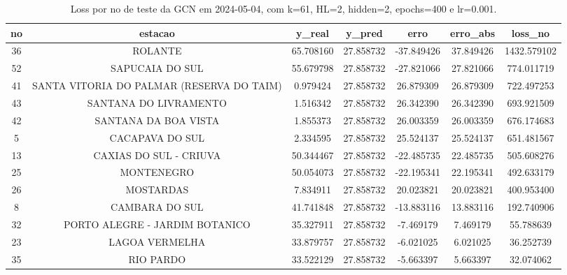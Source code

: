 \begin{table}[h]
\centering
\caption{Loss por no de teste da GCN em 2024-05-04, com k=61, HL=2, hidden=2, epochs=400 e lr=0.001.}
\label{tab:gcn_loss_k61_hl2_h2_e400_d20240504}
\begin{tabular}{ccccccc}
\toprule
no & estacao & y\_real & y\_pred & erro & erro\_abs & loss\_no \\
\midrule
36 & ROLANTE & 65.708160 & 27.858732 & -37.849426 & 37.849426 & 1432.579102 \\
52 & SAPUCAIA DO SUL & 55.679798 & 27.858732 & -27.821066 & 27.821066 & 774.011719 \\
41 & SANTA VITORIA DO PALMAR (RESERVA DO TAIM) & 0.979424 & 27.858732 & 26.879309 & 26.879309 & 722.497253 \\
43 & SANTANA DO LIVRAMENTO & 1.516342 & 27.858732 & 26.342390 & 26.342390 & 693.921509 \\
42 & SANTANA DA BOA VISTA & 1.855373 & 27.858732 & 26.003359 & 26.003359 & 676.174683 \\
5 & CACAPAVA DO SUL & 2.334595 & 27.858732 & 25.524137 & 25.524137 & 651.481567 \\
13 & CAXIAS DO SUL - CRIUVA & 50.344467 & 27.858732 & -22.485735 & 22.485735 & 505.608276 \\
25 & MONTENEGRO & 50.054073 & 27.858732 & -22.195341 & 22.195341 & 492.633179 \\
26 & MOSTARDAS & 7.834911 & 27.858732 & 20.023821 & 20.023821 & 400.953400 \\
8 & CAMBARA DO SUL & 41.741848 & 27.858732 & -13.883116 & 13.883116 & 192.740906 \\
32 & PORTO ALEGRE - JARDIM BOTANICO & 35.327911 & 27.858732 & -7.469179 & 7.469179 & 55.788639 \\
23 & LAGOA VERMELHA & 33.879757 & 27.858732 & -6.021025 & 6.021025 & 36.252739 \\
35 & RIO PARDO & 33.522129 & 27.858732 & -5.663397 & 5.663397 & 32.074062 \\
\bottomrule
\end{tabular}
\end{table}
